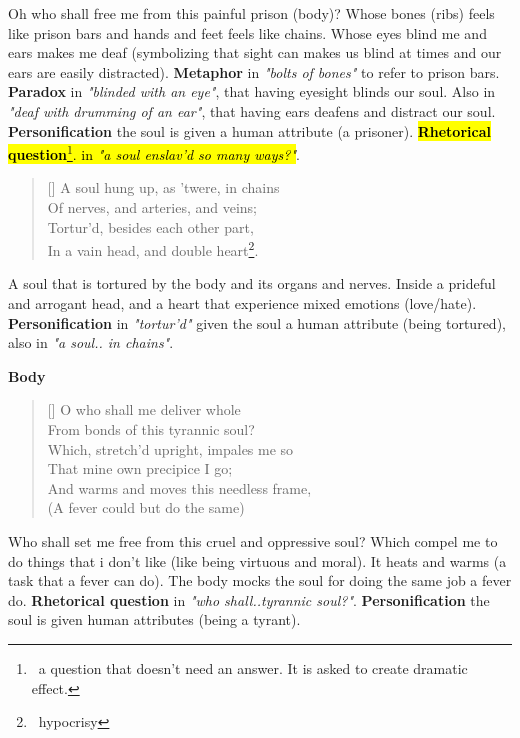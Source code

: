 Oh who shall free me from this painful prison (body)?
Whose bones (ribs) feels like prison bars and hands
and feet feels like chains. Whose eyes blind me 
and ears makes me deaf (symbolizing that sight can 
makes us blind at times and our ears are easily distracted). 
\textbf{Metaphor} in \textit{"bolts of bones"} to refer to prison bars. 
\textbf{Paradox} in \textit{"blinded with an eye"}, that
having eyesight blinds our soul. Also in \textit{"deaf with
drumming of an ear"}, that having ears deafens and distract our
soul. \textbf{Personification} the soul is given a human attribute
(a prisoner). \hl{\textbf{Rhetorical question}\footnote{\, 
a question that doesn't need an answer. It is asked to create dramatic effect.}.
in \textit{"a soul enslav’d so many ways?"}}. 

\begin{verse}[\versewidth]
{\fontverse
A soul hung up, as ’twere, in chains\\
Of nerves, and arteries, and veins;\\
Tortur’d, besides each other part,\\
In a vain head, and double heart\footnote{\, hypocrisy}. 
} 
\end{verse}

A soul that is tortured by the body and its organs and nerves.
Inside a prideful and arrogant head, and a heart that experience
mixed emotions (love/hate). \textbf{Personification} in \textit{"tortur'd"} 
given the soul a human attribute (being tortured), also in \textit{"a soul.. in chains"}.\bigbreak

\centerline{\textbf{\large{Body}}}
\begin{verse}[\versewidth]
{\fontverse
O who shall me deliver whole\\
From bonds of this tyrannic soul?\\
Which, stretch’d upright, impales me so\\
That mine own precipice I go;\\
And warms and moves this needless frame,\\
(A fever could but do the same)
} 
\end{verse}

Who shall set me free from this cruel and oppressive soul? Which compel 
me to do things that i don't like (like being virtuous and moral). It 
heats and warms (a task that a fever can do). The body mocks the soul 
for doing the same job a fever do. \textbf{Rhetorical question} in
\textit{"who shall..tyrannic soul?"}. \textbf{Personification} the soul
is given human attributes (being a tyrant). 

